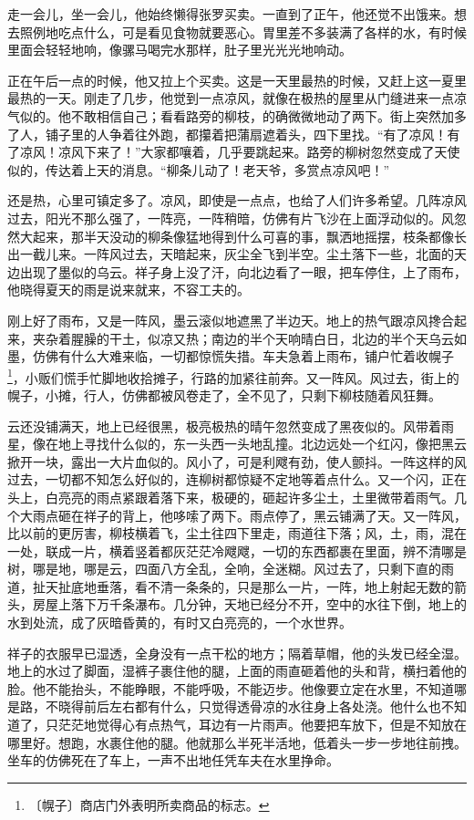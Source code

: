 \documentclass[12pt,UTF-8,openany]{ctexbook}
\begin{document}
\begin{large}
    走一会儿，坐一会儿，他始终懒得张罗买卖。一直到了正午，他还觉不出饿来。想去照例地吃点什么，可是看见食物就要恶心。胃里差不多装满了各样的水，有时候里面会轻轻地响，像骡马喝完水那样，肚子里光光光地响动。
    
    正在午后一点的时候，他又拉上个买卖。这是一天里最热的时候，又赶上这一夏里最热的一天。刚走了几步，他觉到一点凉风，就像在极热的屋里从门缝进来一点凉气似的。他不敢相信自己；看看路旁的柳枝，的确微微地动了两下。街上突然加多了人，铺子里的人争着往外跑，都攥着把蒲扇遮着头，四下里找。“有了凉风！有了凉风！凉风下来了！”大家都嚷着，几乎要跳起来。路旁的柳树忽然变成了天使似的，传达着上天的消息。“柳条儿动了！老天爷，多赏点凉风吧！”
    
    还是热，心里可镇定多了。凉风，即使是一点点，也给了人们许多希望。几阵凉风过去，阳光不那么强了，一阵亮，一阵稍暗，仿佛有片飞沙在上面浮动似的。风忽然大起来，那半天没动的柳条像猛地得到什么可喜的事，飘洒地摇摆，枝条都像长出一截儿来。一阵风过去，天暗起来，灰尘全飞到半空。尘土落下一些，北面的天边出现了墨似的乌云。祥子身上没了汗，向北边看了一眼，把车停住，上了雨布，他晓得夏天的雨是说来就来，不容工夫的。
    
    刚上好了雨布，又是一阵风，墨云滚似地遮黑了半边天。地上的热气跟凉风搀合起来，夹杂着腥臊的干土，似凉又热；南边的半个天响晴白日，北边的半个天乌云如墨，仿佛有什么大难来临，一切都惊慌失措。车夫急着上雨布，铺户忙着收幌子\footnote{〔幌子〕商店门外表明所卖商品的标志。}，小贩们慌手忙脚地收拾摊子，行路的加紧往前奔。又一阵风。风过去，街上的幌子，小摊，行人，仿佛都被风卷走了，全不见了，只剩下柳枝随着风狂舞。
    
    云还没铺满天，地上已经很黑，极亮极热的晴午忽然变成了黑夜似的。风带着雨星，像在地上寻找什么似的，东一头西一头地乱撞。北边远处一个红闪，像把黑云掀开一块，露出一大片血似的。风小了，可是利飕有劲，使人颤抖。一阵这样的风过去，一切都不知怎么好似的，连柳树都惊疑不定地等着点什么。又一个闪，正在头上，白亮亮的雨点紧跟着落下来，极硬的，砸起许多尘土，土里微带着雨气。几个大雨点砸在祥子的背上，他哆嗦了两下。雨点停了，黑云铺满了天。又一阵风，比以前的更厉害，柳枝横着飞，尘土往四下里走，雨道往下落；风，土，雨，混在一处，联成一片，横着竖着都灰茫茫冷飕飕，一切的东西都裹在里面，辨不清哪是树，哪是地，哪是云，四面八方全乱，全响，全迷糊。风过去了，只剩下直的雨道，扯天扯底地垂落，看不清一条条的，只是那么一片，一阵，地上射起无数的箭头，房屋上落下万千条瀑布。几分钟，天地已经分不开，空中的水往下倒，地上的水到处流，成了灰暗昏黄的，有时又白亮亮的，一个水世界。
    
    祥子的衣服早已湿透，全身没有一点干松的地方；隔着草帽，他的头发已经全湿。地上的水过了脚面，湿裤子裹住他的腿，上面的雨直砸着他的头和背，横扫着他的脸。他不能抬头，不能睁眼，不能呼吸，不能迈步。他像要立定在水里，不知道哪是路，不晓得前后左右都有什么，只觉得透骨凉的水往身上各处浇。他什么也不知道了，只茫茫地觉得心有点热气，耳边有一片雨声。他要把车放下，但是不知放在哪里好。想跑，水裹住他的腿。他就那么半死半活地，低着头一步一步地往前拽。坐车的仿佛死在了车上，一声不出地任凭车夫在水里挣命。
    

\end{large}
\end{document}
